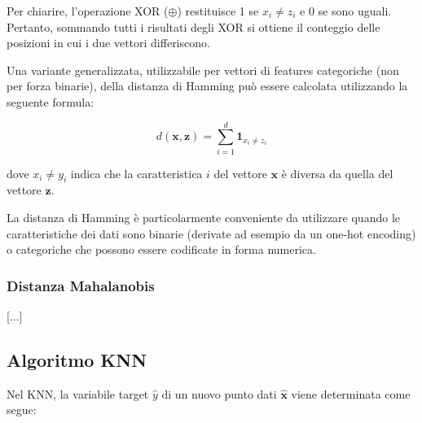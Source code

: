 Per chiarire, l'operazione XOR ($\oplus$) restituisce 1 se $x_i \neq z_i$ e 0 se sono uguali. 
Pertanto, sommando tutti i risultati degli XOR si ottiene il conteggio delle posizioni in cui i due vettori differiscono.

Una variante generalizzata, utilizzabile per vettori di features categoriche (non per forza binarie), 
della distanza di Hamming può essere calcolata utilizzando la seguente formula:

\[
d(\mathbf{x}, \mathbf{z}) = \sum_{i=1}^{d} \mathbf 1_{x_i \neq z_i}
\]

dove $x_i \neq y_i$ indica che la caratteristica $i$ del vettore $\mathbf{x}$ è diversa da quella del vettore $\mathbf{z}$.

La distanza di Hamming è particolarmente conveniente da utilizzare quando le 
caratteristiche dei dati sono binarie (derivate ad esempio da un one-hot encoding) o categoriche 
che possono essere codificate in forma numerica.

\subsubsection{Distanza Mahalanobis}
[...]

\subsection{Algoritmo KNN}

Nel KNN, la variabile target \( \hat{y} \) di un nuovo punto dati \( \hat{\mathbf{x}} \) 
viene determinata come segue:

